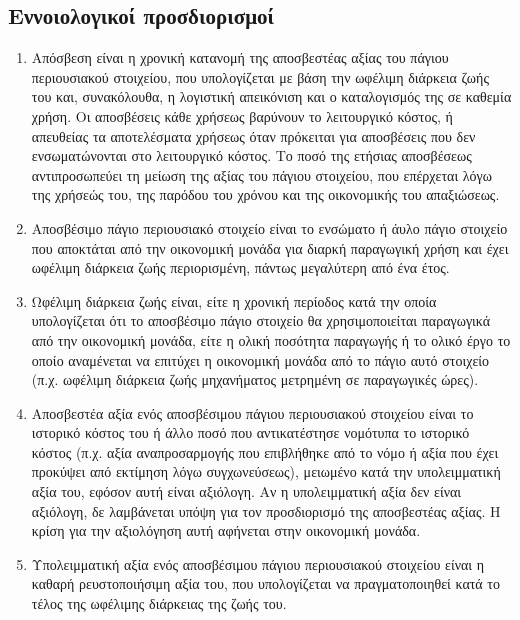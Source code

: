 \documentclass[A4,10pt,greek]{book}
\begin{document}
\subsection{Εννοιολογικοί προσδιορισμοί}
\begin{enumerate}
\item Απόσβεση είναι η χρονική κατανομή της αποσβεστέας αξίας του πάγιου περιουσιακού στοιχείου, που υπολογίζεται με βάση την ωφέλιμη διάρκεια ζωής του και, συνακόλουθα, η λογιστική απεικόνιση και ο καταλογισμός της σε καθεμία χρήση. Οι αποσβέσεις κάθε χρήσεως βαρύνουν το λειτουργικό κόστος, ή απευθείας τα αποτελέσματα χρήσεως όταν πρόκειται για αποσβέσεις που δεν ενσωματώνονται στο λειτουργικό κόστος. Το ποσό της ετήσιας αποσβέσεως αντιπροσωπεύει τη μείωση της αξίας του πάγιου στοιχείου, που επέρχεται λόγω της χρήσεώς του, της παρόδου του χρόνου και της οικονομικής του απαξιώσεως.

\item Αποσβέσιμο πάγιο περιουσιακό στοιχείο είναι το ενσώματο ή άυλο πάγιο στοιχείο που αποκτάται από την οικονομική μονάδα για διαρκή παραγωγική χρήση και έχει ωφέλιμη διάρκεια ζωής περιορισμένη, πάντως μεγαλύτερη από ένα έτος.

\item Ωφέλιμη διάρκεια ζωής είναι, είτε η χρονική περίοδος κατά την οποία υπολογίζεται ότι το αποσβέσιμο πάγιο στοιχείο θα χρησιμοποιείται παραγωγικά από την οικονομική μονάδα, είτε η ολική ποσότητα παραγωγής ή το ολικό έργο το οποίο αναμένεται να επιτύχει η οικονομική μονάδα από το πάγιο αυτό στοιχείο (π.χ.  ωφέλιμη διάρκεια ζωής μηχανήματος μετρημένη σε παραγωγικές ώρες).

\item Αποσβεστέα αξία ενός αποσβέσιμου πάγιου περιουσιακού στοιχείου είναι το ιστορικό κόστος του ή άλλο ποσό που αντικατέστησε νομότυπα το ιστορικό κόστος (π.χ. αξία αναπροσαρμογής που επιβλήθηκε από το νόμο ή αξία που έχει προκύψει από εκτίμηση λόγω συγχωνεύσεως), μειωμένο κατά την υπολειμματική αξία του, εφόσον αυτή είναι αξιόλογη. Αν η υπολειμματική αξία δεν είναι αξιόλογη, δε λαμβάνεται υπόψη για τον προσδιορισμό της αποσβεστέας αξίας. Η κρίση για την αξιολόγηση αυτή αφήνεται στην οικονομική μονάδα.

\item Υπολειμματική αξία ενός αποσβέσιμου πάγιου περιουσιακού στοιχείου είναι η καθαρή ρευστοποιήσιμη αξία του, που υπολογίζεται να πραγματοποιηθεί κατά το τέλος της ωφέλιμης διάρκειας της ζωής του.
\end{enumerate}
\end{document}

